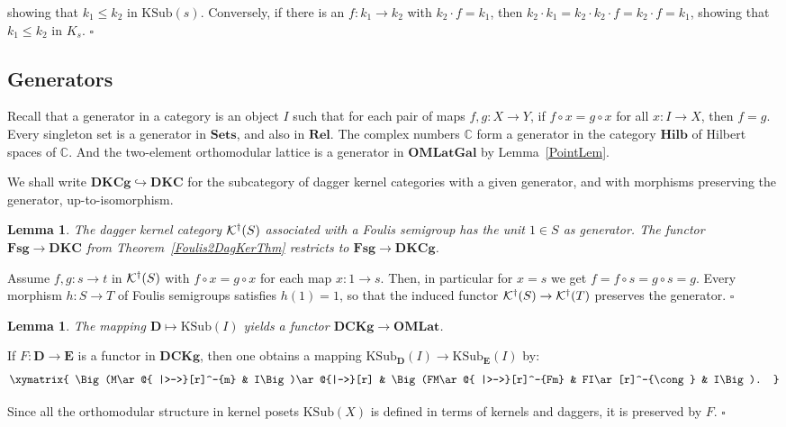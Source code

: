 \documentclass{article}
\newtheorem{lemma}[theorem]{Lemma}
\newenvironment{proof}[1][Proof]{ \begin{trivlist}\item[\hskip \labelsep {\bfseries #1}]}{ \end{trivlist}}
\newcommand{\QEDbox}{\square}
\newcommand{\QED}{\hspace*{\fill}$\QEDbox$}
\newcommand{\after}{\mathrel{\circ}}
\newcommand{\cat}[1]{\ensuremath{\mathbf{#1}}}
\newcommand{\Cat}[1]{\ensuremath{\mathbf{#1}}}
\newcommand{\KSub}{\ensuremath{\mathrm{KSub}}}
\newcommand{\Rel}{\Cat{Rel}\xspace}
\newcommand{\Hilb}{\Cat{Hilb}\xspace}
\newcommand{\Sets}{\Cat{Sets}\xspace}
\newcommand{\dagKaroubi}[1]{{\cal K}^{\dag}(#1)}
\begin{document}
\begin{proof}
\noindent showing that $k_{1} \leq k_{2}$ in $\KSub(s)$. Conversely,
if there is an $f\colon k_{1}\rightarrow k_{2}$ with $k_{2} \cdot f = k_{1}$,
then $k_{2}\cdot k_{1} = k_{2}\cdot k_{2} \cdot f = k_{2} \cdot f = k_{1}$,
showing that $k_{1}\leq k_{2}$ in $K_{s}$. \QED
\end{proof}



\subsection{Generators}\label{GeneratorSubsec}

Recall that a generator in a category is an object $I$ such that for
each pair of maps $f,g\colon X\rightarrow Y$, if $f\after x = g\after
x$ for all $x\colon I\rightarrow X$, then $f=g$. Every singleton set
is a generator in \Sets, and also in \Rel. The complex numbers
$\mathbb{C}$ form a generator in the category \Hilb of Hilbert spaces
of $\mathbb{C}$. And the two-element orthomodular lattice is a
generator in \Cat{OMLatGal} by Lemma~\ref{PointLem}.

We shall write $\Cat{DKCg} \hookrightarrow \Cat{DKC}$ for the subcategory
of dagger kernel categories with a given generator, and with morphisms
preserving the generator, up-to-isomorphism.


\begin{lemma}
The dagger kernel category $\dagKaroubi{S}$ associated with a Foulis
semigroup has the unit $1\in S$ as generator. The functor $\Cat{Fsg}
\rightarrow \Cat{DKC}$ from Theorem~\ref{Foulis2DagKerThm} restricts
to $\Cat{Fsg} \rightarrow \Cat{DKCg}$.
\end{lemma}


\begin{proof}
Assume $f,g\colon s\rightarrow t$ in $\dagKaroubi{S}$ with $f\after x
= g\after x$ for each map $x\colon 1\rightarrow s$. Then, in
particular for $x=s$ we get $f = f\after s = g\after s = g$. Every
morphism $h\colon S\rightarrow T$ of Foulis semigroups satisfies
$h(1) = 1$, so that the induced functor $\dagKaroubi{S} \rightarrow
\dagKaroubi{T}$ preserves the generator. \QED
\end{proof}



\begin{lemma}
The mapping $\cat{D} \mapsto \KSub(I)$ yields a functor
$\Cat{DCKg} \rightarrow \Cat{OMLat}$.
\end{lemma}


\begin{proof}
If $F\colon \cat{D} \rightarrow \cat{E}$ is a functor in $\Cat{DCKg}$,
then one obtains a mapping $\KSub_{\Cat{D}}(I) \rightarrow \KSub_{\Cat{E}}(I)$
by:
$$\xymatrix{
\Big(M\ar@{ |>->}[r]^-{m} & I\Big)\ar@{|->}[r] &
   \Big(FM\ar@{ |>->}[r]^-{Fm} & FI\ar[r]^-{\cong} & I\Big).
}$$

\noindent Since all the orthomodular structure in kernel posets
$\KSub(X)$ is defined in terms of kernels and daggers, it is preserved
by $F$. \QED
\end{proof}
\end{document}
